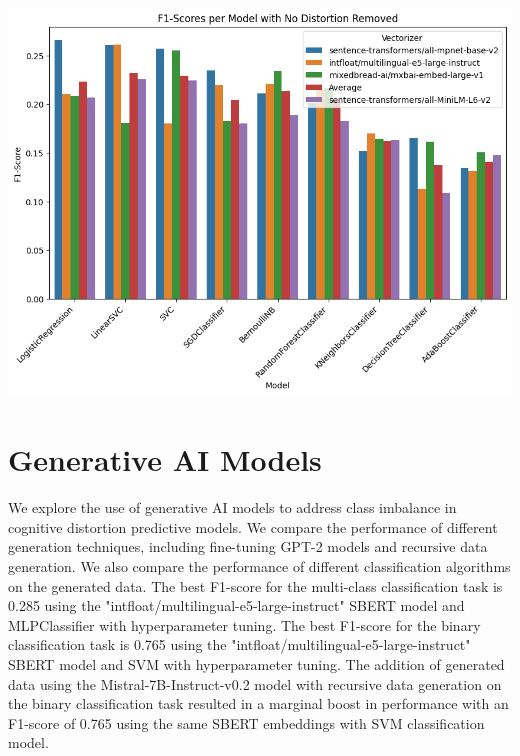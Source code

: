 \documentclass[a0,landscape]{a0poster}
\begin{document}
\begin{multicols}{4}
\begin{center}\vspace{1cm}
\includegraphics[width=0.70\linewidth]{figures/F1ScoresInitSBERT.png}
\end{center}\vspace{1cm}

\color{Black}

\color{Teal}
\section*{Generative AI Models}
\color{Black}

We explore the use of generative AI models to address class imbalance in cognitive distortion predictive models. We compare the performance of different generation techniques, including fine-tuning GPT-2 models and recursive data generation. We also compare the performance of different classification algorithms on the generated data. The best F1-score for the multi-class classification task is 0.285 using the "intfloat/multilingual-e5-large-instruct" SBERT model and MLPClassifier with hyperparameter tuning. The best F1-score for the binary classification task is 0.765 using the "intfloat/multilingual-e5-large-instruct" SBERT model and SVM with hyperparameter tuning. The addition of generated data using the Mistral-7B-Instruct-v0.2 model with recursive data generation on the binary classification task resulted in a marginal boost in performance with an F1-score of 0.765 using the same SBERT embeddings with SVM classification model.


\end{multicols}
\end{document}
